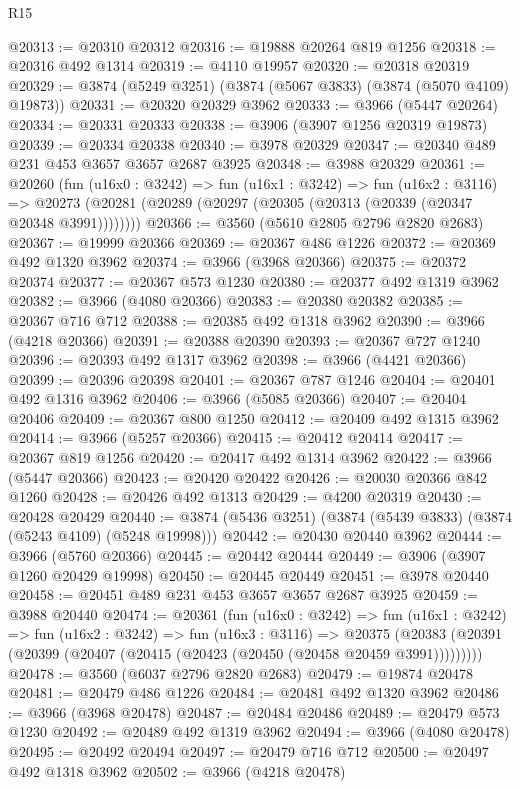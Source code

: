 \begin{lexlean}{R15}
\begin{coremodule}
@20313 := @20310 @20312
@20316 := @19888 @20264 @819 @1256
@20318 := @20316 @492 @1314
@20319 := @4110 @19957
@20320 := @20318 @20319
@20329 := @3874 (@5249 @3251) (@3874 (@5067 @3833) (@3874 (@5070 @4109) @19873))
@20331 := @20320 @20329 @3962
@20333 := @3966 (@5447 @20264)
@20334 := @20331 @20333
@20338 := @3906 (@3907 @1256 @20319 @19873)
@20339 := @20334 @20338
@20340 := @3978 @20329
@20347 := @20340 @489 @231 @453 @3657 @3657 @2687 @3925
@20348 := @3988 @20329
@20361 := @20260
    (fun (u16x0 : @3242) =>
    fun (u16x1 : @3242) =>
    fun (u16x2 : @3116) =>
    @20273 (@20281 (@20289 (@20297 (@20305 (@20313 (@20339 (@20347 @20348 @3991))))))))
@20366 := @3560 (@5610 @2805 @2796 @2820 @2683)
@20367 := @19999 @20366
@20369 := @20367 @486 @1226
@20372 := @20369 @492 @1320 @3962
@20374 := @3966 (@3968 @20366)
@20375 := @20372 @20374
@20377 := @20367 @573 @1230
@20380 := @20377 @492 @1319 @3962
@20382 := @3966 (@4080 @20366)
@20383 := @20380 @20382
@20385 := @20367 @716 @712
@20388 := @20385 @492 @1318 @3962
@20390 := @3966 (@4218 @20366)
@20391 := @20388 @20390
@20393 := @20367 @727 @1240
@20396 := @20393 @492 @1317 @3962
@20398 := @3966 (@4421 @20366)
@20399 := @20396 @20398
@20401 := @20367 @787 @1246
@20404 := @20401 @492 @1316 @3962
@20406 := @3966 (@5085 @20366)
@20407 := @20404 @20406
@20409 := @20367 @800 @1250
@20412 := @20409 @492 @1315 @3962
@20414 := @3966 (@5257 @20366)
@20415 := @20412 @20414
@20417 := @20367 @819 @1256
@20420 := @20417 @492 @1314 @3962
@20422 := @3966 (@5447 @20366)
@20423 := @20420 @20422
@20426 := @20030 @20366 @842 @1260
@20428 := @20426 @492 @1313
@20429 := @4200 @20319
@20430 := @20428 @20429
@20440 := @3874 (@5436 @3251) (@3874 (@5439 @3833) (@3874 (@5243 @4109) (@5248 @19998)))
@20442 := @20430 @20440 @3962
@20444 := @3966 (@5760 @20366)
@20445 := @20442 @20444
@20449 := @3906 (@3907 @1260 @20429 @19998)
@20450 := @20445 @20449
@20451 := @3978 @20440
@20458 := @20451 @489 @231 @453 @3657 @3657 @2687 @3925
@20459 := @3988 @20440
@20474 := @20361
    (fun (u16x0 : @3242) =>
    fun (u16x1 : @3242) =>
    fun (u16x2 : @3242) =>
    fun (u16x3 : @3116) =>
    @20375 (@20383 (@20391 (@20399 (@20407 (@20415 (@20423 (@20450 (@20458 @20459 @3991)))))))))
@20478 := @3560 (@6037 @2796 @2820 @2683)
@20479 := @19874 @20478
@20481 := @20479 @486 @1226
@20484 := @20481 @492 @1320 @3962
@20486 := @3966 (@3968 @20478)
@20487 := @20484 @20486
@20489 := @20479 @573 @1230
@20492 := @20489 @492 @1319 @3962
@20494 := @3966 (@4080 @20478)
@20495 := @20492 @20494
@20497 := @20479 @716 @712
@20500 := @20497 @492 @1318 @3962
@20502 := @3966 (@4218 @20478)

\end{coremodule}
\end{lexlean}
